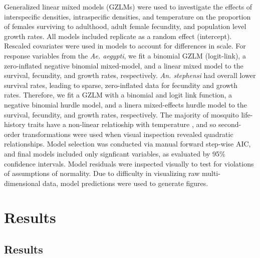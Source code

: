 \documentclass[12pt,]{article}
\begin{document}
Generalized linear mixed models (GZLMs) were used to investigate the
effects of interspecific densities, intraspecific densities, and
temperature on the proportion of females surviving to adulthood, adult
female fecundity, and population level growth rates. All models included
replicate as a random effect (intercept). Rescaled covariates were used
in models to account for differences in scale. For response variables
from the \emph{Ae. aegypti}, we fit a binomial GZLM (logit-link), a
zero-inflated negative binomial mixed-model, and a linear mixed model to
the survival, fecundity, and growth rates, respectively. \emph{An.
stephensi} had overall lower survival rates, leading to sparse,
zero-inflated data for fecundity and growth rates. Therefore, we fit a
GZLM with a binomial and logit link function, a negative binomial hurdle
model, and a linera mixed-effects hurdle model to the survival,
fecundity, and growth rates, respectively. The majority of mosquito
life-history traits have a non-linear relatioship with temperature
\citep{mordecai2017}, and so second-order transformations were used when
visual inspection revealed quadratic relationships. Model selection was
conducted via manual forward step-wise AIC, and final models included
only signficant variables, as evaluated by 95\% confidence intervals.
Model residuals were inspected visually to test for violations of
assumptions of normality. Due to difficulty in visualizing raw
multi-dimensional data, model predictions were used to generate figures.

\section{Results}\label{results}

\subsection{Results}\label{results-1}
\end{document}
